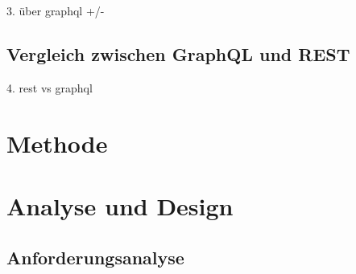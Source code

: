 \documentclass[draft,final]{vutinfth} %
\begin{document}
3. über graphql +/-
\cite{Quinamera:2023:GraphMappingStudy}


\section{Vergleich zwischen GraphQL und REST}

4. rest vs graphql
\cite{Vohra:2022:GraphVsRestImplementation}
\cite{Lawi:2021:GraphVsRestPerformance}

%	
%		
%		
%	









\chapter{Methode}



\chapter{Analyse und Design}

\section{Anforderungsanalyse}
\end{document}
